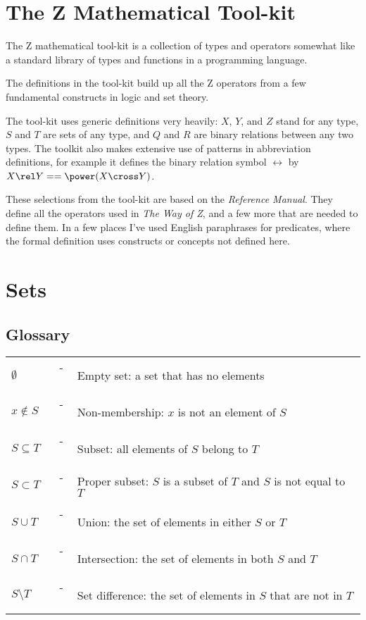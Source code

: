 \section{The Z Mathematical Tool-kit} \label{ch:toolkit}

The Z mathematical tool-kit is a collection of types and operators
somewhat like a standard library of types and functions in a
programming language.

The definitions in the tool-kit build up all the Z operators from
a few fundamental constructs in logic and set theory.

The tool-kit uses generic definitions very heavily: $X$, $Y$, and $Z$
stand for any type, $S$ and $T$ are sets of any type, and $Q$ and $R$
are binary relations between any two types.  The toolkit also makes
extensive use of patterns in abbreviation definitions, for example it
defines the binary relation symbol $\rel$ by $X \rel Y == \power (X \cross Y)$.

These selections from the tool-kit are based on the 
{\em Reference Manual}.  They define all the operators used in 
{\em The Way of Z}, and a few more that are needed to define them.
In a few places I've used English paraphrases for predicates, where
the formal definition uses constructs or concepts not defined here.

\newpage

\section*{Sets}

\subsection*{Glossary}

\begin{tabular}{l c l}
$\emptyset$ & ~-~ & Empty set: a set that has no elements \\
$x \notin S$ & ~-~ & Non-membership: $x$ is not an element of $S$ \\
$S \subseteq T$ & ~-~ & Subset: all elements of $S$ belong to $T$ \\
$S \subset T$ & ~-~ & Proper subset: $S$ is a subset of $T$ and $S$ is not equal to $T$ \\
$S \cup T$ & ~-~ & Union: the set of elements in either $S$ or $T$ \\
$S \cap T$ & ~-~ & Intersection: the set of elements in both $S$ and $T$ \\
$S \setminus T$ & ~-~ & Set difference: the set of elements in $S$ that are not in $T$ \\
\end{tabular}


